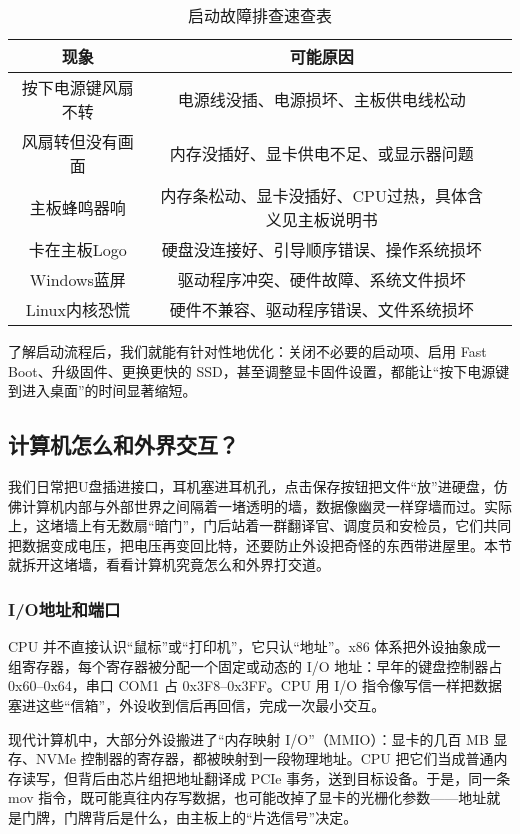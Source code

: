 \begin{table}[htbp]
  \centering
  \caption{启动故障排查速查表}
  \begin{tabular}{ccc}
    \toprule
    现象 & 可能原因 \\
    \midrule
    按下电源键风扇不转 & 电源线没插、电源损坏、主板供电线松动 \\
    风扇转但没有画面 & 内存没插好、显卡供电不足、或显示器问题 \\
    主板蜂鸣器响 & 内存条松动、显卡没插好、CPU过热，具体含义见主板说明书 \\
    卡在主板Logo & 硬盘没连接好、引导顺序错误、操作系统损坏 \\
    Windows蓝屏 & 驱动程序冲突、硬件故障、系统文件损坏 \\
    Linux内核恐慌 & 硬件不兼容、驱动程序错误、文件系统损坏 \\
    \bottomrule
  \end{tabular}
\end{table}

了解启动流程后，我们就能有针对性地优化：关闭不必要的启动项、启用 Fast Boot、升级固件、更换更快的 SSD，甚至调整显卡固件设置，都能让“按下电源键到进入桌面”的时间显著缩短。

\subsection{计算机怎么和外界交互？}

我们日常把U盘插进接口，耳机塞进耳机孔，点击保存按钮把文件“放”进硬盘，仿佛计算机内部与外部世界之间隔着一堵透明的墙，数据像幽灵一样穿墙而过。实际上，这堵墙上有无数扇“暗门”，门后站着一群翻译官、调度员和安检员，它们共同把数据变成电压，把电压再变回比特，还要防止外设把奇怪的东西带进屋里。本节就拆开这堵墙，看看计算机究竟怎么和外界打交道。

\subsubsection{I/O地址和端口}

CPU 并不直接认识“鼠标”或“打印机”，它只认“地址”。x86 体系把外设抽象成一组寄存器，每个寄存器被分配一个固定或动态的 I/O 地址：早年的键盘控制器占 0x60–0x64，串口 COM1 占 0x3F8–0x3FF。CPU 用 I/O 指令像写信一样把数据塞进这些“信箱”，外设收到信后再回信，完成一次最小交互。

现代计算机中，大部分外设搬进了“内存映射 I/O”（MMIO）：显卡的几百 MB 显存、NVMe 控制器的寄存器，都被映射到一段物理地址。CPU 把它们当成普通内存读写，但背后由芯片组把地址翻译成 PCIe 事务，送到目标设备。于是，同一条 mov 指令，既可能真往内存写数据，也可能改掉了显卡的光栅化参数——地址就是门牌，门牌背后是什么，由主板上的“片选信号”决定。

